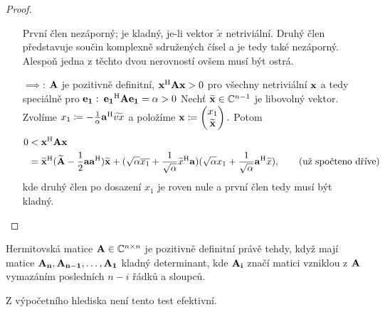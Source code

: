 \begin{proof}
\begin{itemize}
            První člen nezáporný; je kladný, je-li vektor $\widetilde{x}$ 
            netriviální. Druhý člen představuje součin komplexně sdružených 
            čísel a je tedy také nezáporný. Alespoň jedna z těchto dvou
            nerovností ovšem musí být ostrá.
        \item[$\implies$:] $\mathbf{A}$ je pozitivně definitní,
            $\mathbf{x}^{\mathrm{H}}\mathbf{A}\mathbf{x} > 0$ pro všechny netriviální $\mathbf{x}$ a tedy
            speciálně pro $\mathbf{e_1}:$ $\mathbf{e_1}^{\mathrm{H}}\mathbf{A}\mathbf{e_1} = \alpha > 0$
            Nechť $\widetilde{\mathbf{x}} \in \mathbb{C}^{n-1}$ je libovolný vektor. Zvolíme
            $x_1 \coloneqq -\frac{1}{\alpha}\mathbf{a}^{\mathrm{H}}\widetilde{vx}$
            a položíme $\mathbf{x} \coloneqq \begin{pmatrix}x_1\\\widetilde{\mathbf{x}}\end{pmatrix}.$ Potom
            \begin{align*}
                0 &< \mathbf{x}^{\mathrm{H}}\mathbf{A}\mathbf{x} \\
                  &= \widetilde{\mathbf{x}}^{\mathrm{H}} (\mathbf{\widetilde{A}} - \frac{1}{2}\mathbf{a}\mathbf{a}^{\mathrm{H}})\widetilde{\mathbf{x}}
                    + (\sqrt{\alpha}\overline{x_1} + \frac{1}{\sqrt{\alpha}}\widetilde{x}^{\mathrm{H}}\mathbf{a})
                    (\sqrt{\alpha}x_1 + \frac{1}{\sqrt{\alpha}}\mathbf{a}^{\mathrm{H}}\widetilde{x}),
                    \tag{už spočteno dříve}
            \end{align*}
            kde druhý člen po dosazení $x_1$ je roven nule a první člen tedy
            musí být kladný.
    \end{itemize}
\end{proof}

\begin{proposition}
    Hermitovská matice $\mathbf{A} \in \mathbb{C}^{n\times n}$ je pozitivně definitní právě tehdy, když
    mají matice $\mathbf{A_n}, \mathbf{A_{n-1}}, \dots, \mathbf{A_1}$ kladný 
    determinant, kde $\mathbf{A_i}$ značí matici vzniklou z $\mathbf{A}$ vymazáním
    posledních $n-i$ řádků a sloupců.
\end{proposition}

\begin{remark}
    Z výpočetního hlediska není tento test efektivní.
\end{remark}
